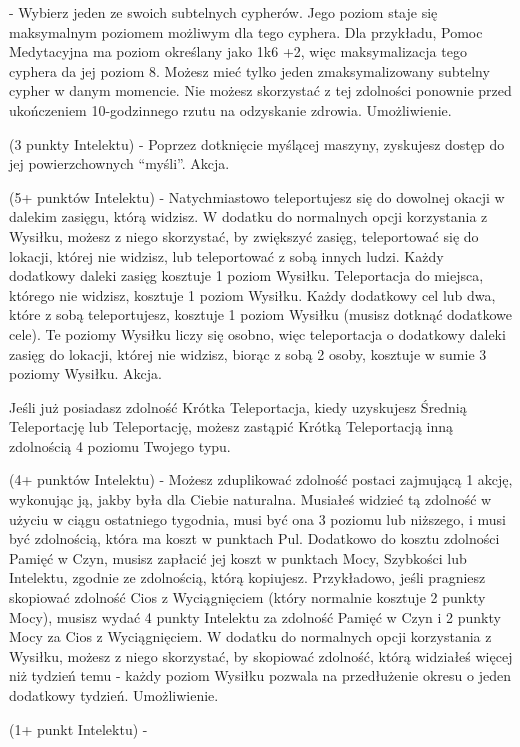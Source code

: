  - Wybierz jeden ze swoich subtelnych cypherów. Jego poziom staje się maksymalnym poziomem możliwym dla tego cyphera. Dla przykładu, Pomoc Medytacyjna ma poziom określany jako 1k6 +2, więc maksymalizacja tego cyphera da jej poziom 8. Możesz mieć tylko jeden zmaksymalizowany subtelny cypher w danym momencie. Nie możesz skorzystać z tej zdolności ponownie przed ukończeniem 10-godzinnego rzutu na odzyskanie zdrowia. Umożliwienie. 

 (3 punkty Intelektu) - Poprzez dotknięcie myślącej maszyny, zyskujesz dostęp do jej powierzchownych ``myśli''. Akcja.

 (5+ punktów Intelektu) - Natychmiastowo teleportujesz się do dowolnej okacji w dalekim zasięgu, którą widzisz. W dodatku do normalnych opcji korzystania z Wysiłku, możesz z niego skorzystać, by zwiększyć zasięg, teleportować się do lokacji, której nie widzisz, lub teleportować z sobą innych ludzi. Każdy dodatkowy daleki zasięg kosztuje 1 poziom Wysiłku. Teleportacja do miejsca, którego nie widzisz, kosztuje 1 poziom Wysiłku. Każdy dodatkowy cel lub dwa, które z sobą teleportujesz, kosztuje 1 poziom Wysiłku (musisz dotknąć dodatkowe cele). Te poziomy Wysiłku liczy się osobno, więc teleportacja o dodatkowy daleki zasięg do lokacji, której nie widzisz, biorąc z sobą 2 osoby, kosztuje w sumie 3 poziomy Wysiłku. Akcja.

Jeśli już posiadasz zdolność Krótka Teleportacja, kiedy uzyskujesz Średnią Teleportację lub Teleportację, możesz zastąpić Krótką Teleportacją inną zdolnością 4 poziomu Twojego typu.

 (4+ punktów Intelektu) - Możesz zduplikować zdolność postaci zajmującą 1 akcję, wykonując ją, jakby była dla Ciebie naturalna. Musiałeś widzieć tą zdolność w użyciu w ciągu ostatniego tygodnia, musi być ona 3 poziomu lub niższego, i musi być zdolnością, która ma koszt w punktach Pul. Dodatkowo do kosztu zdolności Pamięć w Czyn, musisz zapłacić jej koszt w punktach Mocy, Szybkości lub Intelektu, zgodnie ze zdolnością, którą kopiujesz. Przykładowo, jeśli pragniesz skopiować zdolność Cios z Wyciągnięciem (który normalnie kosztuje 2 punkty Mocy), musisz wydać 4 punkty Intelektu za zdolność Pamięć w Czyn i 2 punkty Mocy za Cios z Wyciągnięciem. W dodatku do normalnych opcji korzystania z Wysiłku, możesz z niego skorzystać, by skopiować zdolność, którą widziałeś więcej niż tydzień temu - każdy poziom Wysiłku pozwala na przedłużenie okresu o jeden dodatkowy tydzień. Umożliwienie.

 (1+ punkt Intelektu) - 

